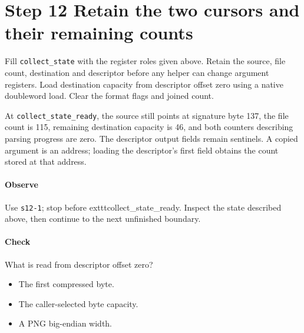 \section{Step 12 Retain the two cursors and their remaining counts}\label{png-collect-s12}
Fill \texttt{collect\_state} with the register roles given above. Retain the source, file count, destination and descriptor before any helper can change argument registers. Load destination capacity from descriptor offset zero using a native doubleword load. Clear the format flags and joined count.

At \texttt{collect\_state\_ready}, the source still points at signature byte 137, the file count is 115, remaining destination capacity is 46, and both counters describing parsing progress are zero. The descriptor output fields remain sentinels. A copied argument is an address; loading the descriptor's first field obtains the count stored at that address.

\paragraph{Observe} Use \texttt{s12-1}; stop before 	exttt{collect\_state\_ready}. Inspect the state described above, then continue to the next unfinished boundary.

\paragraph{Check} What is read from descriptor offset zero?
\begin{itemize}
\item[A.] The first compressed byte.
\item[B.] The caller-selected byte capacity.
\item[C.] A PNG big-endian width.
\end{itemize}
